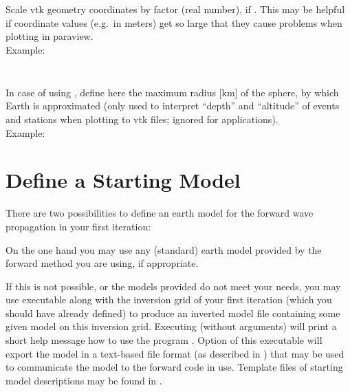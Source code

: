 \subsubsection{}
Scale vtk geometry coordinates by factor  (real number), if 
. This may be helpful if coordinate values (e.g.\ in meters) 
get so large that they cause problems when plotting in paraview.\\
Example:\\
\\
\subsubsection{}
In case of using , define here the maximum radius [km] of the sphere, by which 
Earth is approximated (only used to interpret ``depth'' and ``altitude'' of events and stations when 
plotting to vtk files; ignored for  applications).\\
Example:\\
%
\section{Define a Starting Model} \label{basic_steps,sec:start_model}
%
There are two possibilities to define an earth model for the forward wave propagation in your first iteration:

On the one hand you may use any (standard) earth model provided by the forward method you are using, if appropriate.

If this is not possible, or the models provided do not meet your needs, you may use executable 
 along with the inversion grid of your first iteration (which you should 
have already defined) to produce an inverted model file containing some given model on this inversion grid. 
Executing  (without arguments) will print a short help message how to use the program 
. Option  of this executable will
export the model in a text-based file format (as described in ) 
that may be used to communicate the model to the forward code in use.
Template files of starting model descriptions may be found in .
%
